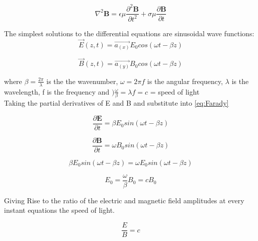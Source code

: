 \documentclass[12pt]{article}
\begin{document}
	\begin{equation}
		\label{eq:identity}
		\nabla^{2}\mathbf{B}=\epsilon\mu \frac{\partial^{2} \mathbf{B}}{\partial t^{2}}+\sigma\mu \frac{\partial \mathbf{B}}{\partial t}
	\end{equation}

	The simplest solutions to the differential equations are sinusoidal wave functions:
	\begin{equation}
		\label{eq:Efield}
		\vec{E}(z,t) = \vec{a_(x)} E_{0} cos(\omega t - \beta z)
	\end{equation}
 
	\begin{equation}
		\label{eq:Bfield}
		\vec{B}(z,t) =  \vec{a_(y)}B_{0} cos(\omega t - \beta z)
	\end{equation}

	where \( \beta = \frac{2\pi}{\lambda} \) 
	is the the wavenumber, 
	\( \omega = 2\pi f \) is the angular frequency,
	\( \lambda \) is the wavelength, f is the
	frequency and \() \frac{\omega}{\beta} = \lambda f = c \) = speed of light \\

	Taking the partial derivatives of E and B and substitute into \cref{eq:Farady}

	\begin{equation}
		\frac{\partial \mathbf{E}} {\partial t} = \beta E_{0} sin(\omega t - \beta z)	
	\end{equation}

	\begin{equation}
		\frac{\partial \mathbf{B}} {\partial t} = \omega B_{0} sin(\omega t - \beta z)
	\end{equation}

	\begin{equation}
		\beta E_{0} sin(\omega t - \beta z)	= \omega E_{0} sin(\omega t - \beta z)
	\end{equation}

	\begin{equation}
		E_{0} = \frac{\omega}{\beta} B_{0} = cB_{0}		
	\end{equation}

	Giving Rise to the ratio of the electric and magnetic field amplitudes at every instant equations the speed of light.

	\begin{equation}
		\frac{E}{B} = c
	\end{equation}
\end{document}
